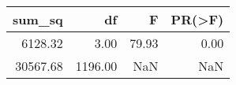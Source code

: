 \begin{tabular}{rrrr}
\toprule
sum\_sq & df & F & PR(>F) \\
\midrule
6128.32 & 3.00 & 79.93 & 0.00 \\
30567.68 & 1196.00 & NaN & NaN \\
\bottomrule
\end{tabular}
